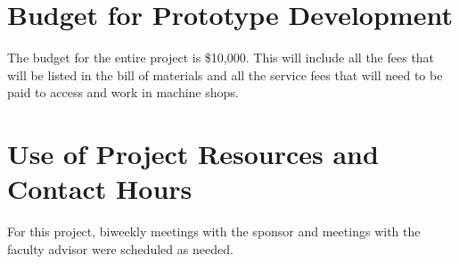 \section{Budget for Prototype Development}
The budget for the entire project is \$10,000. This will include all the fees that will be listed in the bill of materials and all the service fees that will need to be paid to access and work in machine shops.

\section{Use of Project Resources and Contact Hours}
For this project, biweekly meetings with the sponsor and meetings with the faculty advisor were scheduled as needed.